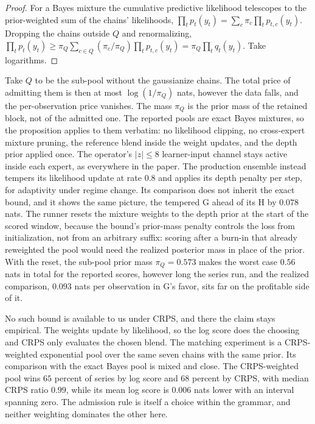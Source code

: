 \documentclass[11pt]{article}
\theoremstyle{remark}
\begin{document}
\begin{proof}
For a Bayes mixture the cumulative predictive likelihood telescopes to the prior-weighted
sum of the chains' likelihoods,
$\prod_t p_t(y_t) = \sum_c \pi_c \prod_t p_{t,c}(y_t)$. Dropping the chains outside $Q$
and renormalizing,
$\prod_t p_t(y_t) \ge \pi_Q \sum_{c \in Q} (\pi_c/\pi_Q) \prod_t p_{t,c}(y_t)
= \pi_Q \prod_t q_t(y_t)$. Take logarithms.
\end{proof}

Take $Q$ to be the sub-pool without the gaussianize chains. The total price of
admitting them is then at most $\log(1/\pi_Q)$ nats, however the data falls, and the
per-observation price vanishes. The mass $\pi_Q$ is the prior mass of the retained
block, not of the admitted one. The reported pools are exact Bayes mixtures, so the
proposition applies to them verbatim: no likelihood clipping, no cross-expert
mixture pruning, the reference blend inside the weight updates, and the depth prior
applied once. The operator's $|z| \le 8$ learner-input channel stays active inside
each expert, as everywhere in the paper. The production ensemble instead tempers its
likelihood update at rate $0.8$ and applies its depth penalty per step, for
adaptivity under regime change. Its comparison does not inherit the exact bound, and
it shows the same picture, the tempered G ahead of its H by $0.078$ nats.
The runner resets the mixture weights to
the depth prior at the start of the scored window, because the bound's prior-mass
penalty controls the loss from initialization, not from an arbitrary suffix: scoring
after a burn-in that already reweighted the pool would need the realized posterior
mass in place of the prior. With the reset, the sub-pool prior mass
$\pi_Q = 0.573$ makes the worst case $0.56$ nats in total for the reported scores,
however long the series run, and the realized comparison, $0.093$ nats per
observation in G's favor, sits far on the profitable side of it.

No such bound is available to us
under CRPS, and there the claim stays empirical. The
weights update by likelihood, so the log score does the choosing and CRPS only evaluates
the chosen blend. The matching experiment is a CRPS-weighted exponential pool over the
same seven chains with the same prior. Its comparison with the exact Bayes pool
is mixed and close. The CRPS-weighted pool wins $65$ percent of series by log score
and $68$ percent by CRPS, with median CRPS ratio $0.99$, while its mean log score is
$0.006$ nats lower with an interval spanning zero. The admission rule is itself a
choice within the grammar, and neither weighting dominates the other here.
\end{document}
